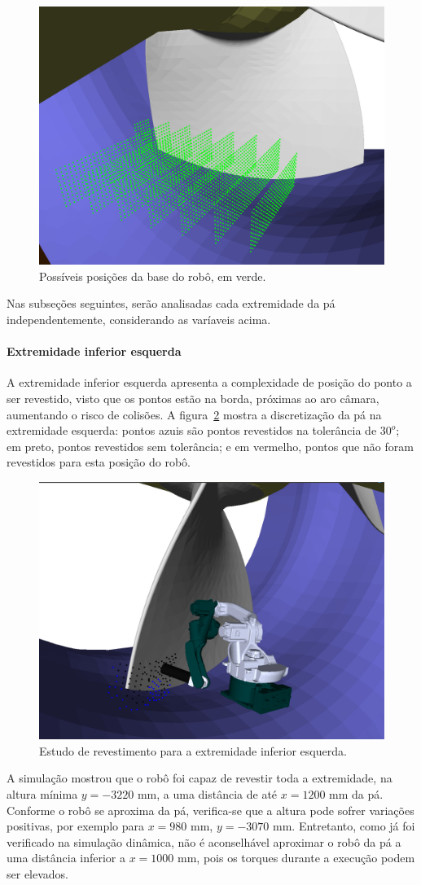 \begin{figure}[!ht]
	\centering	
	\includegraphics[width=.5\columnwidth]{method/figs/trilho2all.png}
	\caption{Possíveis posições da base do robô, em verde.}
	\label{fig::trilho2all}
\end{figure}

Nas subseções seguintes, serão analisadas cada extremidade da
pá independentemente, considerando as varíaveis acima.

\paragraph{Extremidade inferior esquerda}

A extremidade inferior esquerda apresenta a complexidade de posição do ponto a
ser revestido, visto que os pontos estão na borda, próximas ao aro câmara,
aumentando o risco de colisões. A figura~\ref{fig::footleft} mostra a
discretização da pá na extremidade esquerda: pontos azuis são pontos revestidos
na tolerância de $30^o$; em preto, pontos revestidos sem tolerância; e em
vermelho, pontos que não foram revestidos para esta posição do robô.

\begin{figure}[!ht]
	\centering	
	\includegraphics[width=.5\columnwidth]{method/figs/footleft.png}
	\caption{Estudo de revestimento para a extremidade inferior esquerda.}
	\label{fig::footleft}
\end{figure}

A simulação mostrou que o robô foi capaz de revestir toda a extremidade, na
altura mínima $y=-3220$ mm, a uma distância de até $x=1200$ mm da pá. Conforme o
robô se aproxima da pá, verifica-se que a altura pode sofrer variações
positivas, por exemplo para $x=980$ mm, $y=-3070$ mm. Entretanto, como já foi
verificado na simulação dinâmica, não é aconselhável aproximar o robô da pá a
uma distância inferior a $x=1000$ mm, pois os torques durante a execução podem ser
elevados.


